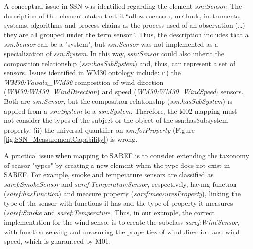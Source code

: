 \documentclass{sig-alternate-05-2015}
\begin{document}
A conceptual issue in SSN was identified regarding the element \textit{ssn:\-Sensor}. The description of this element states that it “allows sensors, methods, instruments, systems, algorithms and process chains as the process used of an observation (…) they are all grouped under the term sensor”. Thus, the description includes that a \textit{ssn:\-Sensor} can be a "system", but \textit{ssn:\-Sensor} was not implemented as a specialization of \textit{ssn:\-System}. In this way, \textit{ssn:\-Sensor} could also inherit the composition relationship (\textit{ssn:\-hasSubSystem}) and, thus, can represent a set of sensors. Issues identified in WM30 ontology include: (i) the \textit{WM30:\-Vaisala\-\_WM30} composition of wind direction (\textit{WM30:\-WM30\-\_Wind\-Direction}) and speed (\textit{WM30:\-WM30\-\_WindSpeed}) sensors. Both are \textit{ssn:\-Sensor}, but the composition relationship (\textit{ssn:\-hasSubSystem}) is applied from a \textit{ssn:\-System} to a \textit{ssn:\-System}. Therefore, the M02 mapping must not consider the types of the subject or the object of the ssn:hasSubsystem property. (ii) the universal quantifier on \textit{ssn:forProperty} (Figure \ref{fig:SSN_MeasurementCapability}) is wrong.

A practical issue when mapping to SAREF is to consider extending the taxonomy of sensor "types" by creating a new element when the type does not exist in SAREF. For example, smoke and temperature sensors are classified as \textit{saref:\-SmokeSensor} and \textit{saref:\-TemperatureSensor,} respectively, having  function (\textit{saref:\-hasFunction}) and measure property (\textit{saref:\-measuresProperty}), linking the type of the sensor with functions it has and the type of property it measures (\textit{saref:\-Smoke} and \textit{saref:\-Temperature}. Thus, in our example, the correct implementation for the wind sensor is to create the subclass \textit{saref:\-WindSensor}, with function sensing and measuring the properties of wind direction and wind speed, which is guaranteed by M01. 
\end{document}
